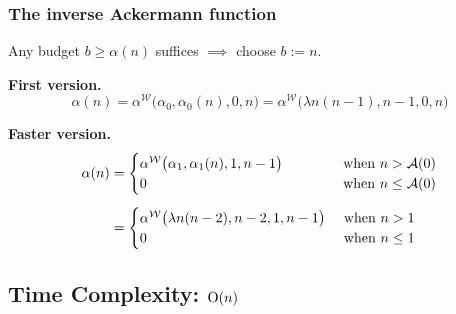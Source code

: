 \begin{frame}
\frametitle{The inverse Ackermann function}
Any budget $b \ge \alpha(n)$ suffices $\implies$ choose $b := n$.

\bigskip

\textbf{First version.}
\begin{equation*}
\alpha(n) = \alpha^{\mathcal{W}}\big(\alpha_0, \alpha_0(n), 0, n\big)
= \alpha^{\mathcal{W}}\big(\lambda n(n - 1), n - 1, 0, n\big)
\end{equation*}

\smallskip

\textbf{Faster version.}
\begin{equation*}
\begin{aligned}
\alpha(n) & = \begin{cases}
\alpha^{\mathcal{W}}\big(\alpha_1, \alpha_1(n), 1, n - 1\big) & \hspace{3em}\text{ when } n > \mathcal{A}(0) \\
0 & \hspace{3em}\text{ when } n \le \mathcal{A}(0)
\end{cases} \\[5pt]
& = \begin{cases}
\alpha^{\mathcal{W}}\big(\lambda n(n - 2), n - 2, 1, n - 1\big) & \text{ when } n > 1 \\
0 & \text{ when } n \le 1
\end{cases}
\end{aligned}
\end{equation*}

\end{frame}


\subsection{Time Complexity: $\text{O}(n)$}

